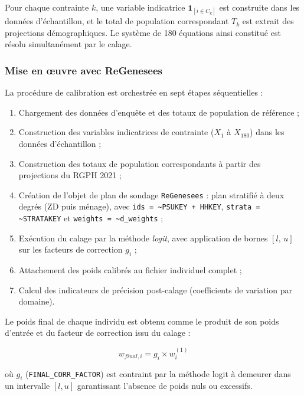 \documentclass[12pt, a4paper]{article}
\begin{document}
Pour chaque contrainte $k$, une variable indicatrice $\mathbf{1}_{[i \in C_k]}$ est construite dans les données d'échantillon, et le total de population correspondant $T_k$ est extrait des projections démographiques. Le système de 180 équations ainsi constitué est résolu simultanément par le calage.

\subsubsection{Mise en \oe{}uvre avec ReGenesees}

La procédure de calibration est orchestrée en sept étapes séquentielles :

\begin{enumerate}[label=(\roman*), noitemsep]
  \item Chargement des données d'enquête et des totaux de population de référence ;
  \item Construction des variables indicatrices de contrainte ($X_1$ à $X_{180}$) dans les données d'échantillon ;
  \item Construction des totaux de population correspondants à partir des projections du RGPH 2021 ;
  \item Création de l'objet de plan de sondage \texttt{ReGenesees} : plan stratifié à deux degrés (ZD puis ménage), avec \texttt{ids = \textasciitilde PSUKEY + HHKEY}, \texttt{strata = \textasciitilde STRATAKEY} et \texttt{weights = \textasciitilde d\_weights} ;
  \item Exécution du calage par la méthode \textit{logit}, avec application de bornes $[l,\, u]$ sur les facteurs de correction $g_i$ ;
  \item Attachement des poids calibrés au fichier individuel complet ;
  \item Calcul des indicateurs de précision post-calage (coefficients de variation par domaine).
\end{enumerate}

Le poids final de chaque individu est obtenu comme le produit de son poids d'entrée et du facteur de correction issu du calage :

\begin{equation}
  w_{final,i} = g_i \times w^{(1)}_i
\end{equation}

où $g_i$ (\texttt{FINAL\_CORR\_FACTOR}) est contraint par la méthode logit à demeurer dans un intervalle $[l, u]$ garantissant l'absence de poids nuls ou excessifs.
\end{document}
